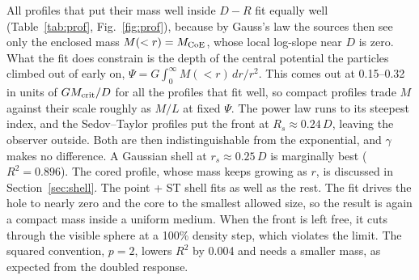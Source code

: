 \documentclass[10pt,letterpaper]{article}
\begin{document}
All profiles that put their mass well inside $D-R$ fit equally well (Table~\ref{tab:prof}, Fig.~\ref{fig:prof}), because by Gauss's law the sources then see only the enclosed mass $M(<r)=M_{\rm CoE}$, whose local log-slope near $D$ is zero. What the fit does constrain is the depth of the central potential the particles climbed out of early on, $\Psi=G\int_0^\infty M(<r)\,dr/r^2$. This comes out at 0.15--0.32 in units of $GM_{\rm crit}/D$ for all the profiles that fit well, so compact profiles trade $M$ against their scale roughly as $M/L$ at fixed $\Psi$. The power law runs to its steepest index, and the Sedov--Taylor profiles put the front at $R_s\approx0.24\,D$, leaving the observer outside. Both are then indistinguishable from the exponential, and $\gamma$ makes no difference. A Gaussian shell at $r_s\approx0.25\,D$ is marginally best ($R^2=0.896$). The cored profile, whose mass keeps growing as $r$, is discussed in Section~\ref{sec:shell}. The point + ST shell fits as well as the rest. The fit drives the hole to nearly zero and the core to the smallest allowed size, so the result is again a compact mass inside a uniform medium. When the front is left free, it cuts through the visible sphere at a 100\% density step, which violates the limit. The squared convention, $p=2$, lowers $R^2$ by 0.004 and needs a smaller mass, as expected from the doubled response.
\end{document}
